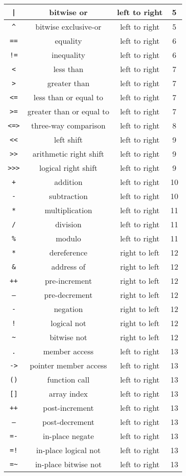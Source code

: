 \documentclass[letterpaper,12pt]{book}
\begin{document}
\begin{longtable}{|c|c|c|c|}
\hline
\texttt{|} & bitwise or & left to right & 5\\
\hline
\texttt{\^{}} & bitwise exclusive-or & left to right & 5\\
\hline
\texttt{==} & equality & left to right & 6\\
\hline
\texttt{!=} & inequality & left to right & 6\\
\hline
\texttt{<} & less than & left to right & 7\\
\hline
\texttt{>} & greater than & left to right & 7\\
\hline
\texttt{<=} & less than or equal to & left to right & 7\\
\hline
\texttt{>=} & greater than or equal to & left to right & 7\\
\hline
\texttt{<=>} & three-way comparison & left to right & 8\\
\hline
\texttt{<<} & left shift & left to right & 9\\
\hline
\texttt{>>} & arithmetic right shift & left to right & 9\\
\hline
\texttt{>>>} & logical right shift & left to right & 9\\
\hline
\texttt{+} & addition & left to right & 10\\
\hline
\texttt{-} & subtraction & left to right & 10\\
\hline
\texttt{*} & multiplication & left to right & 11\\
\hline
\texttt{/} & division & left to right & 11\\
\hline
\texttt{\%} & modulo & left to right & 11\\
\hline
\texttt{*} & dereference & right to left & 12\\
\hline
\texttt{\&} & address of & right to left & 12\\
\hline
\texttt{++} & pre-increment & right to left & 12\\
\hline
\texttt{--} & pre-decrement & right to left & 12\\
\hline
\texttt{-} & negation & right to left & 12\\
\hline
\texttt{!} & logical not & right to left & 12\\
\hline
\texttt{\~{}} & bitwise not & right to left & 12\\
\hline
\texttt{.} & member access & left to right & 13\\
\hline
\texttt{->} & pointer member access & left to right & 13\\
\hline
\texttt{()} & function call & left to right & 13\\
\hline
\texttt{[]} & array index & left to right & 13\\
\hline
\texttt{++} & post-increment & left to right & 13\\
\hline
\texttt{--} & post-decrement & left to right & 13\\
\hline
\texttt{=-} & in-place negate & left to right & 13\\
\hline
\texttt{=!} & in-place logical not & left to right & 13\\
\hline
\texttt{=\~{}} & in-place bitwise not & left to right & 13\\
\hline
\end{longtable}
\end{document}
